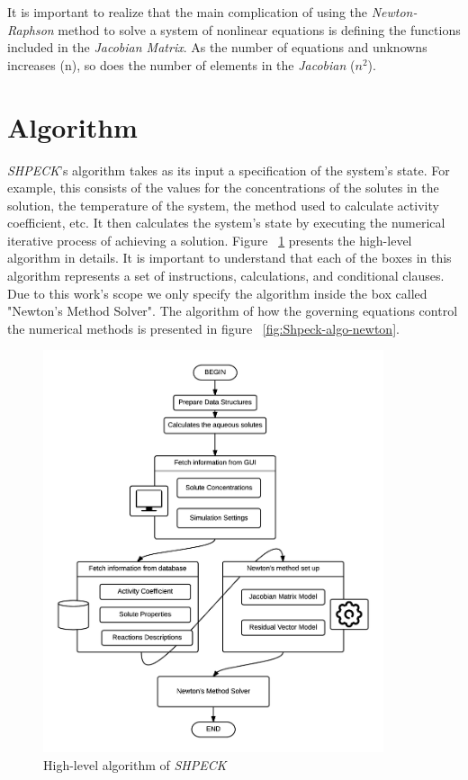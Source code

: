 It is important to realize that the main complication of using the \emph{Newton-Raphson} method to solve a system of nonlinear equations is defining the functions included in the \emph{Jacobian Matrix}. As the number of equations and unknowns increases (n), so does the number of elements in the \emph{Jacobian} ($n^2$).
\section{Algorithm}

\emph{SHPECK}'s algorithm takes as its input a specification of the system's state. For example, this consists of the values for the concentrations of the solutes in the solution, the temperature of the system, the method used to calculate activity coefficient, etc. It then calculates the system's state by executing the numerical iterative process of achieving a solution. 
Figure ~\ref{fig:Shpeck-algo} presents the high-level algorithm in details. It is important to understand that each of the boxes in this algorithm represents a set of instructions, calculations, and conditional clauses. Due to this work's scope we only specify the algorithm inside the box called "Newton's Method Solver". The algorithm of how the governing equations control the numerical methods is presented in figure ~\ref{fig:Shpeck-algo-newton}. 
\begin{figure}[ht!]
\centering
\includegraphics[width=100mm]{figures/Shpeck_algo3.png}
\caption{High-level algorithm of \emph{SHPECK}}
\label{fig:Shpeck-algo}
\end{figure}
